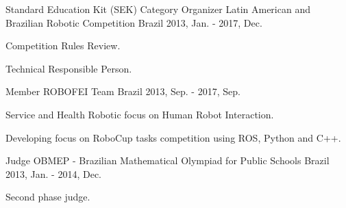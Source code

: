 \begin{cventries}

  \cventry
    {Standard Education Kit (SEK) Category Organizer} %
    {Latin American and Brazilian Robotic Competition} %
    {Brazil} %
    {2013, Jan. - 2017, Dec.} %
    {
      \begin{cvitems} %
        \item {Competition Rules Review.}
        \item {Technical Responsible Person.}
      \end{cvitems}
    }

  \cventry
    {Member} %
    {ROBOFEI Team} %
    {Brazil} %
    {2013, Sep. - 2017, Sep.} %
    {
      \begin{cvitems} %
        \item {Service and Health Robotic focus on Human Robot Interaction.}
        \item {Developing focus on RoboCup \@home tasks competition using ROS, Python and C++.}
      \end{cvitems}
    }

  \cventry
    {Judge} %
    {OBMEP - Brazilian Mathematical Olympiad for Public Schools} %
    {Brazil} %
    {2013, Jan. - 2014, Dec.} %
    {
      \begin{cvitems} %
        \item {Second phase judge.}
      \end{cvitems}
    }

\end{cventries}
